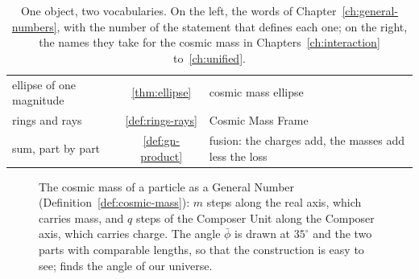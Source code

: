 \begin{table}[tb]
\begin{tabularx}{\textwidth}{@{}>{\raggedright\arraybackslash}p{} c >{\raggedright\arraybackslash}X@{}}
ellipse of one magnitude & \ref{thm:ellipse} & cosmic mass ellipse \\
rings and rays & \ref{def:rings-rays} & Cosmic Mass Frame \\
sum, part by part & \ref{def:gn-product} & fusion: the charges add, the masses add less the loss \\
\bottomrule
\end{tabularx}
\caption[One object, two vocabularies]{One object, two vocabularies. On the left, the words of Chapter~\ref{ch:general-numbers}, with the number of the statement that defines each one; on the right, the names they take for the cosmic mass in Chapters~\ref{ch:interaction} to~\ref{ch:unified}.}
\label{tab:dictionary}
\end{table}

\begin{figure}[tb]
\myfloatalign
{}
\caption[The cosmic mass of a particle]{The cosmic mass of a particle as a General Number (Definition~\ref{def:cosmic-mass}): $m$ steps along the real axis, which carries mass, and $q$ steps of the Composer Unit along the Composer axis, which carries charge. The angle $\bar{\phi}$ is drawn at $35^\circ$ and the two parts with comparable lengths, so that the construction is easy to see;  finds the angle of our universe.}
\label{fig:cosmic-mass-plane}
\end{figure}

